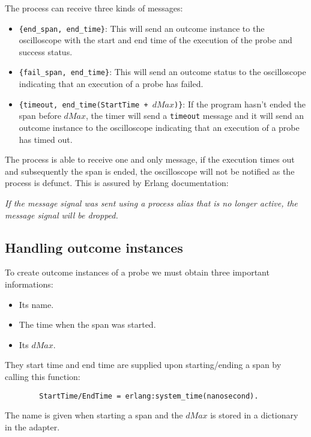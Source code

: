         The process can receive three kinds of messages:
        \begin{itemize}
            \item \texttt{\{end\_span, end\_time\}}: This will send an outcome instance to the oscilloscope with the start and end time of the execution of the probe and success status.
            \item \texttt{\{fail\_span, end\_time\}}: This will send an outcome status to the oscilloscope indicating that an execution of a probe has failed.
            \item \texttt{\{timeout, end\_time(StartTime + $dMax$)\}}: If the program hasn't ended the span before $dMax$, the timer will send a \texttt{timeout} message and it will send an outcome instance to the oscilloscope indicating that an execution of a probe has timed out.
        \end{itemize}
        The process is able to receive one and only message, if the execution times out and subsequently the span is ended, the oscilloscope will not be notified as the process is defunct. This is assured by Erlang documentation:
        \begin{center}
            \textit{If the message signal was sent using a process alias that is no longer active, the message signal will be dropped.} \cite{erl-s}
        \end{center}

    \subsection{Handling outcome instances}
        To create outcome instances of a probe we must obtain three important informations:
        \begin{itemize}
            \item Its name.
            \item The time when the span was started.
            \item Its $dMax$.
        \end{itemize}
        
        They start time and end time are supplied upon starting/ending a span by calling this function:
        \begin{verbatim}
        StartTime/EndTime = erlang:system_time(nanosecond).
        \end{verbatim}
        The name is given when starting a span and the $dMax$ is stored in a dictionary in the adapter. 

